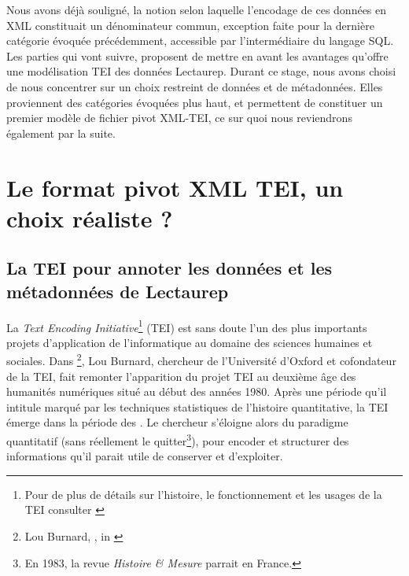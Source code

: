 Nous avons déjà souligné, la notion selon laquelle l'encodage de ces données en XML constituait un dénominateur commun, exception faite pour la dernière catégorie évoquée précédemment, accessible par l'intermédiaire du langage SQL. Les parties qui vont suivre, proposent de mettre en avant les avantages qu'offre une modélisation TEI des données Lectaurep. Durant ce stage, nous avons choisi de nous concentrer sur un choix restreint de données et de métadonnées. Elles proviennent des catégories évoquées plus haut, et permettent de constituer un premier modèle de fichier pivot XML-TEI, ce sur quoi nous reviendrons également par la suite. 

\section{Le format pivot XML TEI, un choix réaliste ?}
\subsection{La TEI pour annoter les données et les métadonnées de Lectaurep}

La \textit{Text Encoding Initiative}\footnote{Pour de plus de détails sur l'histoire, le fonctionnement et les usages de la TEI consulter \cite{burnard_quest-ce_2015}} (TEI) est sans doute l'un des plus importants projets d'application de l'informatique au domaine des sciences humaines et sociales. Dans \footnote{Lou Burnard, , in \cite{mounier_dir_readwrite_2012}}, Lou Burnard, chercheur de l'Université d'Oxford et cofondateur de la TEI, fait remonter l'apparition du projet TEI au deuxième âge des humanités numériques situé au début des années 1980.  Après une période qu'il intitule  marqué par les techniques statistiques de l'histoire quantitative, la TEI émerge dans la période des . Le chercheur s'éloigne alors du paradigme quantitatif (sans réellement le quitter\footnote{En 1983, la revue \textit{Histoire \& Mesure} parrait en France.}), pour encoder et structurer des informations qu'il parait utile de conserver et d'exploiter.

